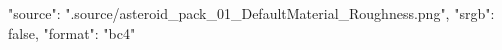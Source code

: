 {
    "source": ".source/asteroid_pack_01_DefaultMaterial_Roughness.png",
    "srgb": false,
    "format": "bc4"
}

